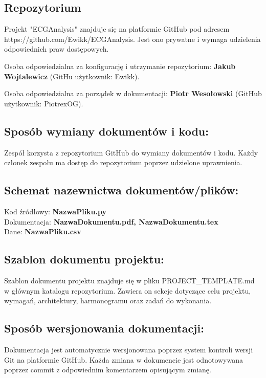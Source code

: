\documentclass[12pt]{article}
\begin{document}
        \subsection*{Repozytorium}
            Projekt "ECGAnalysis" znajduje się na platformie GitHub pod adresem https://github.com/Ewikk/ECGAnalysis. Jest ono prywatne i wymaga udzielenia odpowiednich praw dostępowych. 

            Osoba odpowiedzialna za konfigurację i utrzymanie repozytorium: \textbf{Jakub Wojtalewicz} (GitHu użytkownik: Ewikk). 

            Osoba odpowiedzialna za porządek w dokumentacji: \textbf{Piotr Wesołowski} (GitHub użytkownik: PiotrexOG). 


        \subsection*{Sposób wymiany dokumentów i kodu:} 
            Zespół korzysta z repozytorium GitHub do wymiany dokumentów i kodu. Każdy członek zespołu ma dostęp do repozytorium poprzez udzielone uprawnienia. 

        \subsection*{Schemat nazewnictwa dokumentów/plików:}
            Kod źródłowy: \textbf{NazwaPliku.py} \\
            Dokumentacja: \textbf{NazwaDokumentu.pdf, NazwaDokumentu.tex}\\
            Dane: \textbf{NazwaPliku.csv}

        \subsection*{Szablon dokumentu projektu:}
            Szablon dokumentu projektu znajduje się w pliku PROJECT\_TEMPLATE.md w głównym katalogu repozytorium. Zawiera on sekcje dotyczące celu projektu, wymagań, architektury, harmonogramu oraz zadań do wykonania. 

        \subsection*{Sposób wersjonowania dokumentacji:} 
            Dokumentacja jest automatycznie wersjonowana poprzez system kontroli wersji Git na platformie GitHub. Każda zmiana w dokumencie jest odnotowywana poprzez commit z odpowiednim komentarzem opisującym zmianę. 
\end{document}
